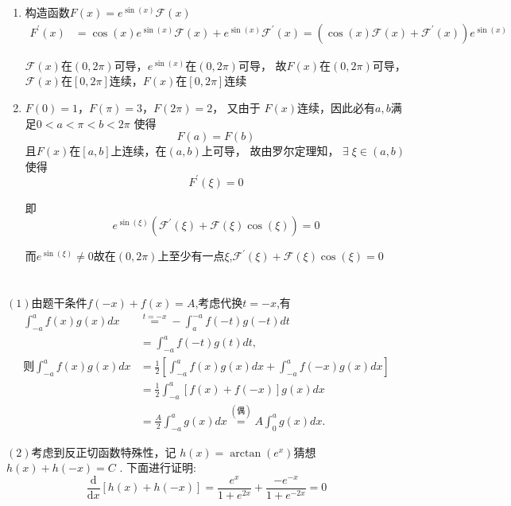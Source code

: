 \section{}
 
\noindent
\begin{enumerate}[(1)]
  \item 构造函数$F(x)=e^{\sin(x)}\mathscr{F}(x)$
$$\begin{aligned}
 F^{'}(x) &=\cos(x)e^{\sin(x)}\mathscr{F}(x)+e^{\sin(x)}\mathscr{F}^{'}(x)=(\cos(x)\mathscr{F}(x)+\mathscr{F}^{'}(x))e^{\sin(x)}
\end{aligned}$$

$\mathscr{F}(x)$在$(0,2\pi)$可导，$e^{\sin(x)}$在$(0,2\pi)$可导，
故$F(x)$在$(0,2\pi)$可导，$\mathscr{F}(x)$在$[0,2\pi]$连续，$F(x)$在$[0,2\pi]$连续
\item $F(0)=1$，$F(\pi)=3$，$F(2\pi)=2$，
又由于 $F(x)$连续，因此必有$a,b$满足$0<a<\pi<b<2\pi$
使得$$ F(a)=F(b)$$
且$F(x)$在$[a,b]$上连续，在$(a,b)$上可导，
故由罗尔定理知，
\(\exists\; \xi \in (a, b)\)使得$$F^{'}{(\xi)}=0$$

即$$e^{\sin(\xi)}(\mathscr{F}^{'}(\xi)+\mathscr{F}(\xi)\cos(\xi))=0$$

而$e^{\sin(\xi)}\ne 0$故在$(0,2\pi)$上至少有一点$\xi$,$\mathscr{F}^{'}(\xi)+\mathscr{F}(\xi)\cos(\xi)=0$

\end{enumerate}




\section{}
$\left(1\right)$由题干条件$f(-x)+f(x)=A$,考虑代换$t=-x$,有
$$
\begin{aligned}
\int_{-a}^{a} f(x) g(x) d x & \stackrel{t=-x}{=}-\int_{a}^{-a} f(-t) g(-t) d t \\
& =\int_{-a}^{a} f(-t) g(t) d t, \\
\text{则} \int_{-a}^{a} f(x) g(x) d x & =\frac{1}{2}\left[\int_{-a}^{a} f(x) g(x) d x+\int_{-a}^{a} f(-x) g(x) d x\right] \\
& =\frac{1}{2} \int_{-a}^{a}[f(x)+f(-x)] g(x) d x \\
& =\frac{A}{2} \int_{-a}^{a} g(x) d x \stackrel{\left(\text{偶}\right)}{=} A \int_{0}^{a} g(x) d x .
\end{aligned}$$

$\left(2\right)$考虑到反正切函数特殊性，记 
$h(x)=\arctan(e^{x})$猜想$h(x)+h(-x)=C $ .
下面进行证明:$$\frac{\mathrm{d} }{\mathrm{d} x} {[h(x)+h(-x)]}=\frac{e^{x}}{1+e^{2x}} +\frac{-e^{-x}}{1+e^{-2x}}=0 $$

